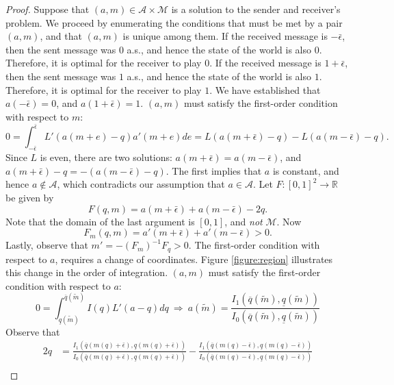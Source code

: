 \documentclass[12pt]{article}
\begin{document}
\begin{proof}
Suppose that $(a,m)\in\mathcal{A}\times\mathcal{M}$ is a solution to the sender and receiver's problem. We proceed by enumerating the conditions that must be met by a pair $(a,m)$, and that $(a,m)$ is unique among them. If the received message is $-\bar{\epsilon}$, then the sent message was $0$ a.s., and hence the state of the world is also $0$. Therefore, it is optimal for the receiver to play $0$. If the received message is $1+\bar{\epsilon}$, then the sent message was $1$ a.s., and hence the state of the world is also $1$. Therefore, it is optimal for the receiver to play $1$. We have established that $a(-\bar{\epsilon})=0$, and $a(1+\bar{\epsilon})=1$. $(a,m)$ must satisfy the first-order condition with respect to $m$:
\begin{equation}
0=\int_{-\bar{\epsilon}}^{\bar{\epsilon}}{L'(a(m+e)-q)a'(m+e)de}=L(a(m+\bar{\epsilon})-q)-L(a(m-\bar{\epsilon})-q).
\end{equation}
Since $L$ is even, there are two solutions: $a(m+\bar{\epsilon})=a(m-\bar{\epsilon})$, and $a(m+\bar{\epsilon})-q=-(a(m-\bar{\epsilon})-q)$. The first implies that $a$ is constant, and hence $a\not\in\mathcal{A}$, which contradicts our assumption that $a\in\mathcal{A}$. Let $F:[0,1]^2\rightarrow\mathbb{R}$ be given by
\begin{equation}
F(q,m)=a(m+\bar{\epsilon})+a(m-\bar{\epsilon})-2q. 
\end{equation}
Note that the domain of the last argument is $[0,1]$, and \textit{not} $\mathcal{M}$. Now 
\begin{equation}
F_{m}(q,m)=a'(m+\bar{\epsilon})+a'(m-\bar{\epsilon})>0. 
\end{equation}
Lastly, observe that $m'=-(F_{m})^{-1}F_{q}>0$. The first-order condition with respect to $a$, requires a change of coordinates. Figure \ref{figure:region} illustrates this change in the order of integration. $(a,m)$ must satisfy the first-order condition with respect to $a$:
\begin{equation}
0=\int_{\underline{q}(\tilde{m})}^{\overline{q}(\tilde{m})}{I(q)L'(a-q)dq}\:\Rightarrow\:a(\tilde{m})=\frac{I_{1}(\overline{q}(\tilde{m}),\underline{q}(\tilde{m}))}{I_{0}(\overline{q}(\tilde{m}),\underline{q}(\tilde{m}))}
\end{equation}
Observe that
\begin{align}
2q&=\frac{I_{1}(\overline{q}(m(q)+\bar{\epsilon}),\underline{q}(m(q)+\bar{\epsilon}))}{I_{0}(\overline{q}(m(q)+\bar{\epsilon}),\underline{q}(m(q)+\bar{\epsilon}))}-\frac{I_{1}(\overline{q}(m(q)-\bar{\epsilon}),\underline{q}(m(q)-\bar{\epsilon}))}{I_{0}(\overline{q}(m(q)-\bar{\epsilon}),\underline{q}(m(q)-\bar{\epsilon}))}\\

\end{align}
\end{proof}
\end{document}

